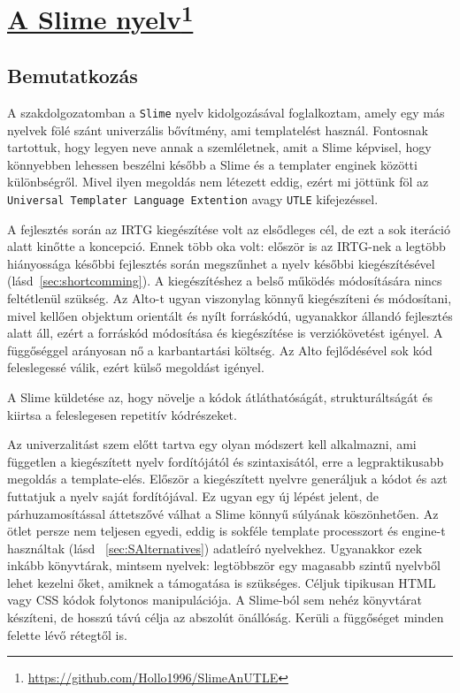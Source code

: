 
\chapter[A Slime nyelv]{\href{https://github.com/Hollo1996/SlimeAnUTLE}{A Slime nyelv}\footnote{\url{https://github.com/Hollo1996/SlimeAnUTLE}}}
\label{sec:Slime}
\section{Bemutatkozás}
\label{sec:SIntro}
A szakdolgozatomban a \texttt{Slime} nyelv kidolgozásával foglalkoztam, amely egy más nyelvek fölé szánt univerzális bővítmény, ami templatelést használ.
Fontosnak tartottuk, hogy legyen neve annak a szemléletnek, amit a Slime képvisel, hogy könnyebben lehessen beszélni később a Slime és a templater enginek közötti különbségről. 
Mivel ilyen megoldás nem létezett eddig, ezért mi jöttünk föl az \texttt{Universal Templater Language Extention} avagy \texttt{UTLE} kifejezéssel.


A fejlesztés során az IRTG kiegészítése volt az elsődleges cél, de ezt a sok iteráció alatt kinőtte a koncepció. 
Ennek több oka volt: először is az IRTG-nek a legtöbb hiányossága későbbi fejlesztés során megszűnhet a nyelv későbbi kiegészítésével (lásd~\ref{sec:shortcomming}).
A kiegészítéshez a belső működés módosítására nincs feltétlenül szükség. 
Az Alto-t ugyan viszonylag könnyű kiegészíteni és módosítani, mivel kellően objektum orientált és nyílt forráskódú,
ugyanakkor állandó fejlesztés alatt áll, ezért a forráskód módosítása és kiegészítése is verziókövetést igényel. 
A függőséggel arányosan nő a karbantartási költség. 
Az Alto fejlődésével sok kód feleslegessé válik, ezért külső megoldást igényel. 
 
A Slime küldetése az, hogy növelje a kódok átláthatóságát, strukturáltságát és kiirtsa a feleslegesen repetitív kódrészeket.

Az univerzalitást szem előtt tartva egy olyan módszert kell alkalmazni, ami független a kiegészített nyelv fordítójától és szintaxisától, erre a legpraktikusabb megoldás a template-elés. 
Először a kiegészített nyelvre generáljuk a kódot és azt futtatjuk a nyelv saját fordítójával. 
Ez ugyan egy új lépést jelent, de párhuzamosítással áttetszővé válhat a Slime könnyű súlyának köszönhetően. 
Az ötlet persze nem teljesen egyedi, eddig is sokféle template processzort és engine-t használtak (lásd ~\ref{sec:SAlternatives}) adatleíró nyelvekhez. 
Ugyanakkor ezek inkább könyvtárak, mintsem nyelvek: legtöbbször egy magasabb szintű nyelvből lehet kezelni őket, amiknek a támogatása is szükséges. 
Céljuk tipikusan HTML vagy CSS kódok folytonos manipulációja. 
A Slime-ból sem nehéz könyvtárat készíteni, de hosszú távú célja az abszolút önállóság. 
Kerüli a függőséget minden felette lévő rétegtől is.

